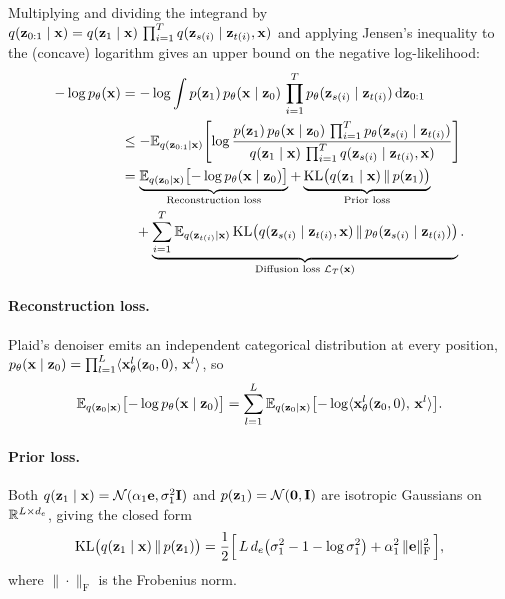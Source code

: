 \documentclass{article}
\begin{document}
%

Multiplying and dividing the integrand by $q({\mathbf z}_{0:1}\mid{\mathbf x})=q({\mathbf z}_1\mid{\mathbf x})\,\prod_{i=1}^T q({\mathbf z}_{s(i)}\mid{\mathbf z}_{t(i)},{\mathbf x})$ and applying Jensen's inequality to the (concave) logarithm gives an upper bound on the negative log-likelihood:
\begin{align*}
    -\log p_\theta({\mathbf x})
    &= -\log \int p({\mathbf z}_1)\, p_\theta({\mathbf x}\mid{\mathbf z}_0)\, \prod_{i=1}^T p_\theta({\mathbf z}_{s(i)}\mid{\mathbf z}_{t(i)})\, {\mathrm{d}}{\mathbf z}_{0:1} \\
    &\le -\mathbb{E}_{q({\mathbf z}_{0:1}\mid{\mathbf x})}\!\left[\log
        \frac{p({\mathbf z}_1)\, p_\theta({\mathbf x}\mid{\mathbf z}_0)\, \prod_{i=1}^T p_\theta({\mathbf z}_{s(i)}\mid{\mathbf z}_{t(i)})}
             {q({\mathbf z}_1\mid{\mathbf x})\,\prod_{i=1}^T q({\mathbf z}_{s(i)}\mid{\mathbf z}_{t(i)},{\mathbf x})}\right] \\
    &= \underbrace{\mathbb{E}_{q({\mathbf z}_0\mid{\mathbf x})}\bigl[-\log p_\theta({\mathbf x}\mid{\mathbf z}_0)\bigr]}_{\text{Reconstruction loss}}
       + \underbrace{\operatorname{KL}\bigl(q({\mathbf z}_1\mid{\mathbf x})\,\|\,p({\mathbf z}_1)\bigr)}_{\text{Prior loss}} \\
    &\quad + \underbrace{\sum_{i=1}^T \mathbb{E}_{q({\mathbf z}_{t(i)}\mid{\mathbf x})}\operatorname{KL}\bigl(q({\mathbf z}_{s(i)}\mid{\mathbf z}_{t(i)},{\mathbf x})\,\|\,p_\theta({\mathbf z}_{s(i)}\mid{\mathbf z}_{t(i)})\bigr)}_{\text{Diffusion loss }\mathcal{L}_T({\mathbf x})}.
\end{align*}
%

\paragraph{Reconstruction loss.}
Plaid's denoiser emits an independent categorical distribution at every position, $p_\theta({\mathbf x}\mid{\mathbf z}_0)=\prod_{l=1}^L \langle {\mathbf x}_\theta^l({\mathbf z}_0, 0),\,{\mathbf x}^l\rangle$, so
\begin{align}\label{eq:vdm-reconst-loss}
    \mathbb{E}_{q({\mathbf z}_0\mid{\mathbf x})}\bigl[-\log p_\theta({\mathbf x}\mid{\mathbf z}_0)\bigr]
    = \sum_{l=1}^L \mathbb{E}_{q({\mathbf z}_0\mid{\mathbf x})}\bigl[-\log\langle {\mathbf x}_\theta^l({\mathbf z}_0,0),\,{\mathbf x}^l\rangle\bigr].
\end{align}
%

\paragraph{Prior loss.}
Both $q({\mathbf z}_1\mid{\mathbf x})=\mathcal{N}(\alpha_1{\mathbf e},\sigma_1^2{\mathbf I})$ and $p({\mathbf z}_1)=\mathcal{N}(\bm{0},{\mathbf I})$ are isotropic Gaussians on $\mathbb{R}^{L\times d_e}$, giving the closed form
\begin{align*}
    \operatorname{KL}\bigl(q({\mathbf z}_1\mid{\mathbf x})\,\|\,p({\mathbf z}_1)\bigr)
    = \frac{1}{2}\Bigl[\, L\,d_e\bigl(\sigma_1^2 - 1 - \log\sigma_1^2\bigr) + \alpha_1^2\,\|{\mathbf e}\|_\mathrm{F}^2 \,\Bigr],
\end{align*}
where $\|\cdot\|_\mathrm{F}$ is the Frobenius norm.
\end{document}
